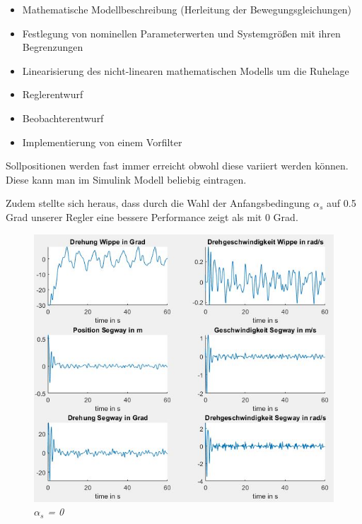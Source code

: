 \documentclass[pdf]{ifacconf}
\begin{document}
\begin{itemize}
\item Mathematische Modellbeschreibung (Herleitung der Bewegungsgleichungen)  
\item Festlegung von nominellen Parameterwerten und Systemgrößen mit ihren Begrenzungen  
\item Linearisierung des nicht-linearen mathematischen Modells um die Ruhelage
\item Reglerentwurf
\item Beobachterentwurf
\item Implementierung von einem Vorfilter
\end{itemize}

Sollpositionen werden fast immer erreicht obwohl diese variiert werden können. Diese kann man im Simulink Modell beliebig eintragen.

Zudem stellte sich heraus, dass durch die Wahl der Anfangsbedingung $\alpha^{}_{s}$ auf 0.5 Grad unserer Regler eine bessere Performance zeigt als mit 0 Grad.  

\begin{figure}[h]	
\centerline{\includegraphics[width=\linewidth]{Bilder/Alf0undRef0.jpg}}
	\label{fig:theFig}
	\caption{\textit{$\alpha^{}_{s}$ = 0}}
\end{figure}
\end{document}
